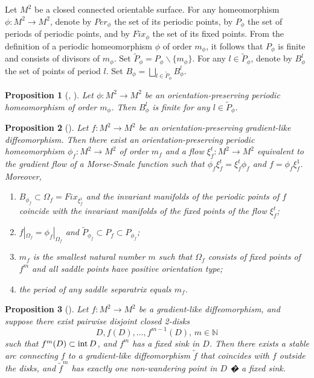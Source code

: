 \documentclass{amsart}
\newtheorem{propos}{Proposition}
\numberwithin{equation}{section}
\begin{document}
	Let $M^2$ be a closed connected orientable surface.
	For any homeomorphism $\phi:M^2 \rightarrow M^2$, denote by $Per_\phi$ the set of its periodic points, by $P_\phi$ the set of periods of periodic points, and by $Fix_\phi$ the set of its fixed points. From the definition of a periodic homeomorphism $\phi$ of order $m_\phi$, it follows that $P_\phi$ is finite and consists of divisors of $m_\phi$. Set $\tilde P_\phi=P_\phi \backslash\{m_\phi\}$. For any $l\in\tilde P_\phi$, denote by $B_\phi^l$ the set of points of period $l$. Set $B_\phi=\bigsqcup\limits_{l\in \tilde P_\phi} B_\phi^l$. 
	
	\begin{propos}[\cite{Nielsen37}, \cite{yoko}]\label{data}
		Let $\phi :M^2 \rightarrow M^2$ be an orientation-preserving periodic homeomorphism of order $m_\phi$. Then $B_\phi^l$ is finite for any $l\in \tilde P_{\phi}$.	
	\end{propos}	
	
	\begin{propos}[\cite{treh}]\label{mn} Let $f:M^2 \rightarrow M^2$ be an orientation-preserving gradient-like diffeomorphism. Then there exist an orientation-preserving periodic homeomorphism $\phi_f:M^2 \rightarrow M^2$ of order $m_{f}$ and a flow $\xi^t_f:M^2 \rightarrow M^2$ equivalent to the gradient flow of a Morse-Smale function such that $\phi_f\xi^t_f=\xi^t_f\phi_f$ and $f=\phi_f\xi^1_f$. Moreover,
		\begin{enumerate}
			\item[1)] $B_{\phi_f}\subset\Omega_f=Fix_{\xi^1_f}$ and the invariant manifolds of the periodic points of $f$ coincide with the invariant manifolds of the fixed points of the flow $\xi^t_f$; 
			\item[2)] $f|_{\Omega_f}=\phi_f|_{\Omega_f}$ and $\tilde P_{\phi_f} \subset P_f \subset P_{\phi_f}$;
			\item[3)] $m_f$ is the smallest natural number $m$ such that $\Omega_f$ consists of fixed points of $f^m$ and all saddle points have positive orientation type; 
			\item[4)] the period of any saddle separatrix equals $m_f$.
		\end{enumerate}
	\end{propos}
	
	\begin{propos}[\cite{np2021}]\label{sad-no}
		Let $f:M^2\to M^2$ be a gradient-like diffeomorphism, and suppose there exist pairwise disjoint closed 2-disks $$D,f(D),\dots,f^{m-1}(D),\,m\in\mathbb N$$ such that $f^m(D)\subset {\rm int}\, D$, and $f^m$ has a fixed sink in $D$. Then there exists a stable arc connecting $f$ to a gradient-like diffeomorphism $\tilde f$ that coincides with $f$ outside the disks, and $\tilde f^m$ has exactly one non-wandering point in $D$ � a fixed sink.
	\end{propos}	
	
\end{document}
